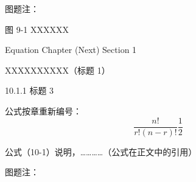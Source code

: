 \documentclass[UTF8, scheme=chinese, openany, oneside]{ctexbook}
\begin{document}
\noindent \hspace{2em} 图题注：

\vspace{0.8cm}

\begin{center}
     图 9-1 \quad XXXXXX
\end{center}

\newpage
{}
\vspace*{5cm}
\begin{center}
{\color{white} Equation Chapter (Next) Section 1}
\end{center}


\clearpage
\setcounter{chapter}{9}
\setcounter{page}{21}


\vspace{1cm}
\begin{center}
{ \quad XXXXXXXXXX（标题 1）}
\end{center}
\vspace{0.8cm}


\vspace{0.3cm}
\noindent \hspace{2em} { 10.1.1 \quad 标题 3}

\vspace{1.2cm}
\noindent \hspace{2em} 公式按章重新编号：
\vspace{0.6cm}
\begin{equation}
\frac{n!}{r!(n-r)!} \frac{1}{2} \tag{10-1} \label{eq:10-1}
\end{equation}

\vspace{1.8cm}
\noindent \hspace{2em} 公式（10-1）说明，…………（公式在正文中的引用）
\vspace{3.5cm}

\noindent \hspace{2em} 图题注：
\end{document}

